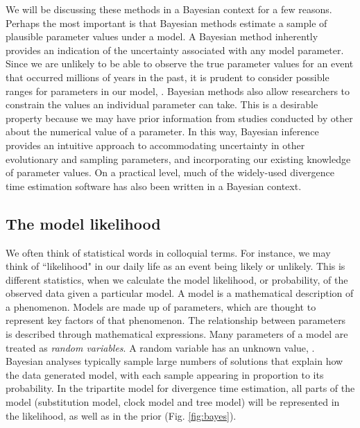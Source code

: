 We will be discussing these methods in a Bayesian context for a few reasons.
Perhaps the most important is that Bayesian methods estimate a sample of plausible parameter values under a model.
A Bayesian method inherently provides an indication of the uncertainty associated with any model parameter.
Since we are unlikely to be able to observe the true parameter values for an event that occurred millions of years in the past, it is prudent to consider possible ranges for parameters in our model, .
Bayesian methods also allow researchers to constrain the values an individual parameter can take.
This is a desirable property because we may have prior information from studies conducted by other  about the numerical value of a parameter.
In this way, Bayesian inference provides an intuitive approach to accommodating uncertainty in other evolutionary and sampling parameters, and incorporating our existing knowledge of parameter values.
On a practical level, much of the widely-used divergence time estimation software has also been written in a Bayesian context.


\subsection{The model likelihood}

We often think of statistical words in colloquial terms.
For instance, we may think of ``likelihood" in our daily life as an event being likely or unlikely.
This is different  statistics, when we calculate the model likelihood, or probability, of the observed data given a particular model.
A model is a mathematical description of a phenomenon.
Models are made up of parameters, which are thought to represent key factors of that phenomenon.
The relationship between parameters is described through mathematical expressions.
Many parameters of a model are treated as \textit{random variables}.
A random variable has an unknown value, .
Bayesian analyses typically sample large numbers of solutions that explain how the data  generated  model, with each sample appearing in proportion to its probability.
In the tripartite model for divergence time estimation, all parts of the model (substitution model, clock model and tree model) will be represented in the likelihood, as well as in the prior (Fig. \ref{fig:bayes}).


